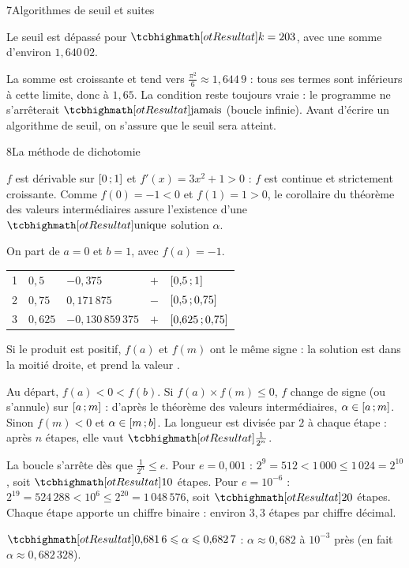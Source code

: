 \begin{corrige}{7}{Algorithmes de seuil et suites}
\begin{questions}[resume]
\begin{codecote}[0.42]
\medskip
Le seuil est dépassé pour $\res{k=203}$, avec une somme d'environ $1{,}640\,02$.
\end{codecote}
  \item La somme est croissante et tend vers $\frac{\pi^{2}}{6}\approx1{,}644\,9$ : tous ses termes sont inférieurs à cette limite, donc
    à $1{,}65$. La condition  reste toujours vraie : le programme ne s'arrêterait $\res{\text{jamais}}$ (boucle infinie).
    Avant d'écrire un algorithme de seuil, on s'assure que le seuil sera atteint.
\end{questions}
\end{corrige}

\begin{corrige}{8}{La méthode de dichotomie}
\begin{questions}
  \item $f$ est dérivable sur $\mathopen{[}0\,{;}\,1\mathclose{]}$ et $f'(x)=3x^{2}+1>0$ : $f$ est continue et strictement croissante. Comme $f(0)=-1<0$ et
    $f(1)=1>0$, le corollaire du théorème des valeurs intermédiaires assure l'existence d'une $\res{\text{unique}}$ solution $\alpha$.
  \item On part de $a=0$ et $b=1$, avec $f(a)=-1$.
\par\nopagebreak\smallskip
{\renewcommand{\arraystretch}{1.25}%
\begin{tabularx}{\linewidth}{@{}lYYcY@{}}
\toprule
{} &  &  &  &  \\
 & $0{,}5$ & $-0{,}375$ & $+$ & $\mathopen{[}0{,}5\,{;}\,1\mathclose{]}$ \\
2 & $0{,}75$ & $0{,}171\,875$ & $-$ & $\mathopen{[}0{,}5\,{;}\,0{,}75\mathclose{]}$ \\
3 & $0{,}625$ & $-0{,}130\,859\,375$ & $+$ & $\mathopen{[}0{,}625\,{;}\,0{,}75\mathclose{]}$ \\
\bottomrule
\end{tabularx}}\par\smallskip
    Si le produit est positif, $f(a)$ et $f(m)$ ont le même signe : la solution est dans la moitié droite, et  prend la valeur
    .
  \item Au départ, $f(a)<0<f(b)$. Si $f(a)\times f(m)\leq0$, $f$ change de signe (ou s'annule) sur $\mathopen{[}a\,{;}\,m\mathclose{]}$ : d'après le théorème
    des valeurs intermédiaires, $\alpha\in\mathopen{[}a\,{;}\,m\mathclose{]}$. Sinon $f(m)<0$ et $\alpha\in\mathopen{[}m\,{;}\,b\mathclose{]}$. La longueur est divisée par $2$ à
    chaque étape : après $n$ étapes, elle vaut $\res{\frac{1}{2^{n}}}$.
  \item La boucle s'arrête dès que $\frac1{2^{n}}\leq e$. Pour $e=0{,}001$ : $2^{9}=512<1\,000\leq1\,024=2^{10}$, soit $\res{10}$ étapes.
    Pour $e=10^{-6}$ : $2^{19}=524\,288<10^{6}\leq2^{20}=1\,048\,576$, soit $\res{20}$ étapes. Chaque étape apporte un chiffre binaire :
    environ $3{,}3$ étapes par chiffre décimal.
  \item $\res{0{,}681\,6\leq\alpha\leq0{,}682\,7}$ : $\alpha\approx0{,}682$ à $10^{-3}$ près (en fait $\alpha\approx0{,}682\,328$).
\end{questions}
\end{corrige}

